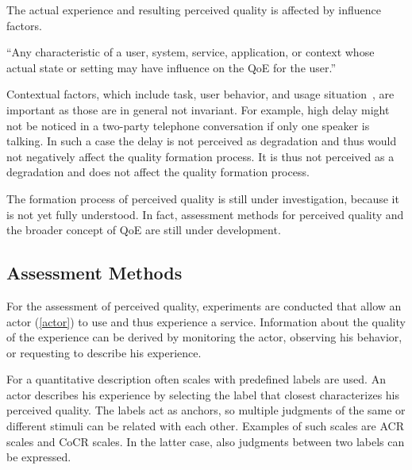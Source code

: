 The actual experience and resulting perceived quality is affected by influence factors.
\begin{definition}
``Any characteristic of a user, system, service, application, or context whose actual state or setting may have influence on the \ac{QoE} for the user.''~\citep[][p.~56]{reiter_factors_2014}
\end{definition}
Contextual factors, which include task, user behavior, and usage situation~\citep[][p.~56]{reiter_factors_2014}, are important as those are in general not invariant.
For example, high delay might not be noticed in a two-party telephone conversation if only one speaker is talking.
In such a case the delay is not perceived as degradation and thus would not negatively affect the quality formation process.
It is thus not perceived as a degradation and does not affect the quality formation process. %

The formation process of perceived quality is still under investigation, because it is not yet fully understood. %
In fact, assessment methods for perceived quality and the broader concept of \ac{QoE} are still under development.

\subsection{Assessment Methods}
For the assessment of perceived quality, experiments are conducted that allow an actor (\autoref{actor}) to use and thus experience a service.
Information about the quality of the experience can be derived by monitoring the actor, observing his behavior, or requesting to describe his experience.

For a quantitative description often scales with predefined labels are used.
An actor describes his experience by selecting the label that closest characterizes his perceived quality.
The labels act as anchors, so multiple judgments of the same or different stimuli can be related with each other.
Examples of such scales are \acf{ACR} scales and \acf{CoCR} scales.
In the latter case, also judgments between two labels can be expressed.

